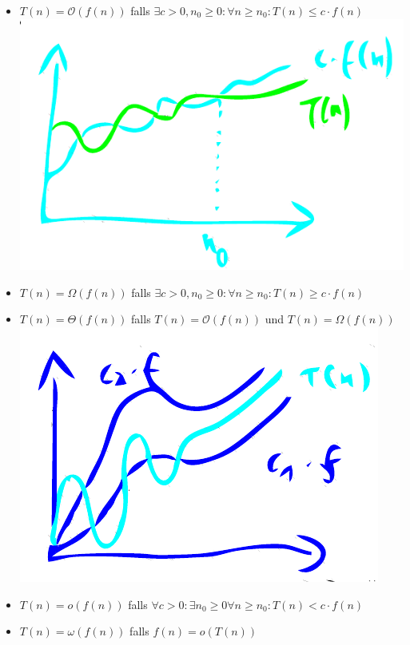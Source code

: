 \documentclass{scrartcl}
\begin{document}
\begin{itemize}
	\item $ T(n) = \mathcal{O}(f(n)) $ falls $ \exists c > 0, n_0 \geq 0: \forall n \geq n_0 : T(n) \leq c \cdot f(n) $ \\
	\includegraphics[width=\linewidth]{figures/o-notation.pdf}
	\item $ T(n) = \Omega(f(n)) $ falls $ \exists c > 0, n_0 \geq 0 : \forall n \geq n_0: T(n) \geq c \cdot f(n) $
	\item $ T(n) = \Theta(f(n)) $ falls $ T(n) = \mathcal{O}(f(n)) $ und $ T(n) = \Omega(f(n)) $ \\
	\includegraphics[width=\linewidth]{figures/theta.pdf}
	\item $ T(n) = o(f(n)) $ falls $ \forall c > 0 : \exists n_0 \geq 0 \forall n \geq n_0 : T(n) < c \cdot f(n) $
	\item $ T(n) = \omega(f(n)) $ falls $ f(n) = o(T(n)) $
\end{itemize}
\end{document}
